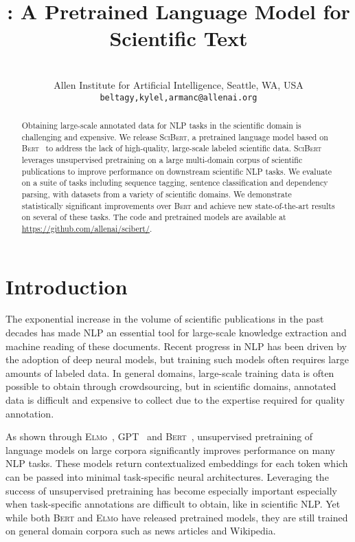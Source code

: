 \documentclass[11pt,a4paper]{article}
\title{\scibert: A Pretrained Language Model for Scientific Text}
\author{\makecell{Iz Beltagy~~~~~~~~Kyle Lo~~~~~~~~Arman Cohan} \\
Allen Institute for Artificial Intelligence, Seattle, WA, USA\\
{\tt beltagy,kylel,armanc@allenai.org}\\}
\date{}
\newcommand{\bert}{\textsc{Bert}\xspace}
\newcommand{\scibert}{\textsc{SciBert}\xspace}
\newcommand{\gpt}{\textsc{GPT}\xspace}
\newcommand{\elmo}{\textsc{Elm}o\xspace}
\begin{document}
\maketitle
\begin{abstract}
  Obtaining large-scale annotated data for NLP tasks in the scientific domain is challenging and expensive. 
We release \scibert,
a pretrained language model based on \bert~\cite{Devlin2018BERTPO} to address the lack of high-quality, large-scale labeled scientific data. \scibert leverages unsupervised pretraining on a large multi-domain corpus of scientific publications to improve performance on downstream scientific NLP tasks.
We evaluate on a suite of tasks including
sequence tagging, sentence classification and dependency parsing, 
with datasets from a variety of scientific domains. We demonstrate statistically significant improvements over \bert and achieve new state-of-the-art results on several of these tasks. The code and pretrained models are available at 
\url{https://github.com/allenai/scibert/}.
\end{abstract}

\section{Introduction}
The exponential increase in the volume of scientific publications in the past decades has made NLP an essential tool for large-scale knowledge extraction and machine reading of these documents. 
Recent progress in NLP has been driven by the adoption of deep neural models, but training such models often requires large amounts of labeled data. 
In general domains, large-scale training data is often possible to obtain through crowdsourcing, but in scientific domains, annotated data is difficult and expensive to collect due to the expertise required for quality annotation.


As shown through \elmo~\cite{Peters2018DeepCW}, \gpt~\cite{radford2018improving} and \bert~\cite{Devlin2018BERTPO},
unsupervised pretraining of language models on large corpora significantly improves performance on many NLP tasks.
These models return contextualized embeddings for each token which can be passed into minimal task-specific neural architectures.
Leveraging the success of unsupervised pretraining has become especially important especially when task-specific annotations are difficult to obtain, like in scientific NLP.  Yet while both \bert and \elmo have released pretrained models, they are still trained on general domain corpora such as news articles and Wikipedia.  
\end{document}
